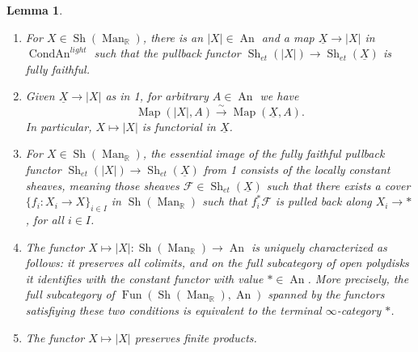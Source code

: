 \documentclass[12pt]{article}
\newtheorem{lemma}[theorem]{Lemma}
\newcommand{\on}{\operatorname}
\newcommand{\mbb}{\mathbb}
\begin{document}
\begin{lemma}\label{manifoldanima}
\begin{enumerate}
\item For $X\in\on{Sh}(\on{Man}_{\mbb{R}})$, there is an $|X|\in\on{An}$ and a map $\underline{X}\rightarrow |X|$ in $\on{CondAn}^{light}$ such that the pullback functor $\on{Sh}_{et}(|X|)\rightarrow\on{Sh}_{et}(\underline{X})$ is fully faithful.
\item Given $\underline{X}\rightarrow |X|$ as in 1, for arbitrary $A\in\on{An}$ we have
$$\on{Map}(|X|,A)\overset{\sim}{\rightarrow} \on{Map}(\underline{X},A).$$
In particular, $X\mapsto |X|$ is functorial in $\underline{X}$.
\item For $X\in\on{Sh}(\on{Man}_{\mbb{R}})$, the essential image of the fully faithful pullback functor $\on{Sh}_{et}(|X|)\rightarrow \on{Sh}_{et}(\underline{X})$ from 1 consists of the locally constant sheaves, meaning those sheaves $\mathcal{F}\in\on{Sh}_{et}(\underline{X})$ such that there exists a cover $\{f_i:X_i\rightarrow X\}_{i\in I}$ in $\on{Sh}(\on{Man}_{\mbb{R}})$ such that $f_i^\ast\mathcal{F}$ is pulled back along $X_i\rightarrow \ast$, for all $i\in I$.
\item The functor $X\mapsto |X|:\on{Sh}(\on{Man}_{\mbb{R}})\rightarrow\on{An}$ is uniquely characterized as follows: it preserves all colimits, and on the full subcategory of open polydisks it identifies with the constant functor with value $\ast\in\on{An}$.  More precisely, the full subcategory of $\on{Fun}(\on{Sh}(\on{Man}_{\mbb{R}}),\on{An})$ spanned by the functors satisfiying these two conditions is equivalent to the terminal $\infty$-category $\ast$.
\item The functor $X\mapsto |X|$ preserves finite products.
\end{enumerate}
\end{lemma}
\end{document}
